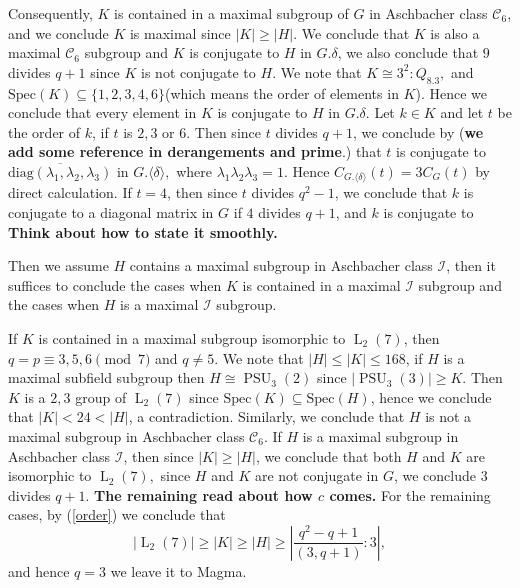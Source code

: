 \documentclass[12pt,reqno]{amsart}
\newcommand{\PSU}{\operatorname{PSU}}
\newcommand{\LL}{\operatorname{L}}
\newcommand{\lr}{\langle}
\newcommand{\rr}{\rangle}
\theoremstyle{plain}
\theoremstyle{definition}
\begin{document}
   Consequently, $K$ is contained in a maximal subgroup of $G$ in Aschbacher class $\mathcal{C}_6$, and we conclude $K$ is maximal since $|K|\ge |H|.$
   We conclude that $K$ is also a maximal $\mathcal{C}_6$ subgroup and $K$ is conjugate to $H$ in $G.\delta$, we also conclude that $9$ divides $q+1$ since $K$ is not conjugate to $H$. 
   We note that $K\cong 3^2:Q_8.3,$ and $\mathrm{Spec}(K)\subseteq\{1,2,3,4,6\}$(which means the order of elements in $K$).  
   Hence we conclude that every element in $K$ is conjugate to $H$ in $G.\delta.$ 
   Let $k\in K$ and let $t$ be the order of $k$, if $t$ is $2,3$ or $6.$ 
   Then since $t$ divides $q+1$, we conclude by (\textbf{we add some reference in derangements and prime}.) that $t$ is conjugate to 
   $\overline{\mathrm{diag}(\lambda_1,\lambda_2,\lambda_3)}$ in $G. \lr \delta \rr,$ where $\lambda_1\lambda_2\lambda_3=1.$
   Hence $C_{G.\lr \delta \rr}(t)=3C_{G}(t)$ by direct calculation.
   If $t=4$, then since $t$ divides $q^2-1$, we conclude that $k$ is conjugate to a diagonal matrix in $G$ if $4$ divides $q+1$, and $k$ is conjugate to \textbf{Think about how to state it smoothly.}  
          
   Then we assume $H$ contains a maximal subgroup in Aschbacher class $\mathcal{I}$, then it suffices to conclude the cases when $K$ is contained in a maximal $\mathcal{I}$ subgroup and the cases when $H$ is a maximal $\mathcal{I}$ subgroup.
   
   If $K$ is contained in a maximal subgroup isomorphic to $\LL_2(7)$, then $q=p\equiv 3,5,6\pmod 7$ and $q\neq 5.$ We note that $|H|\le |K|\le 168$, if $H$ is a maximal subfield subgroup then $H\cong \PSU_3(2)$ since $|\PSU_3(3)|\ge K$. 
   Then $K$ is a $2,3$ group of $\LL_2(7)$ since $\mathrm{Spec}(K)\subseteq \mathrm{Spec}(H)$, hence we conclude that $|K|<24<|H|$, a contradiction.
   Similarly, we conclude that $H$ is not a maximal subgroup in Aschbacher class $\mathcal{C}_6$. 
   If $H$ is a maximal subgroup in Aschbacher class $\mathcal{I}$, then since $|K|\ge |H|$, we conclude that both $H$ and $K$ are isomorphic to $\LL_2(7),$ since $H$ and $K$ are not conjugate in $G$, we conclude $3$ divides $q+1$. \textbf{The remaining read   about how $c$ comes.}
   For the remaining cases, by (\ref{order}) we conclude that $$|\LL_2(7)|\ge|K|\ge |H|\ge |\frac{q^2-q+1}{(3,q+1)}{:}3|,$$
   and hence $q=3$ we leave it to Magma.
   
\end{document}
